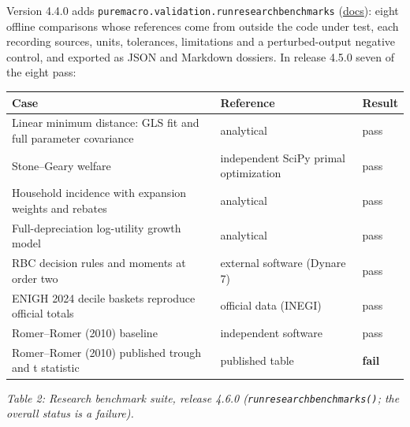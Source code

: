 \documentclass[11pt,letterpaper]{article}
\newcounter{none} %
\renewcommand{\_}{\pmunderscore\allowbreak}
\begin{document}
Version 4.4.0 adds \texttt{puremacro.validation.run\_research\_benchmarks} (\href{https://github.com/jalonso1979/puremacro/blob/v4.6.0/docs/research_benchmarks.md}{docs}): eight offline comparisons whose references come from outside the code under test, each recording sources, units, tolerances, limitations and a perturbed-output negative control, and exported as JSON and Markdown dossiers. In release 4.5.0 seven of the eight pass:

{\def\LTcaptype{none} %
\begin{longtable}[]{@{}
  >{\raggedright\arraybackslash}p{}
  >{\raggedright\arraybackslash}p{}
  >{\centering\arraybackslash}p{}@{}}
\toprule\noalign{}
\begin{minipage}[b]{\linewidth}\raggedright
Case
\end{minipage} & \begin{minipage}[b]{\linewidth}\raggedright
Reference
\end{minipage} & \begin{minipage}[b]{\linewidth}\centering
Result
\end{minipage} \\
\midrule\noalign{}
\endhead
\bottomrule\noalign{}
\endlastfoot
Linear minimum distance: GLS fit and full parameter covariance & analytical & pass \\
Stone--Geary welfare & independent SciPy primal optimization & pass \\
Household incidence with expansion weights and rebates & analytical & pass \\
Full-depreciation log-utility growth model & analytical & pass \\
RBC decision rules and moments at order two & external software (Dynare 7) & pass \\
ENIGH 2024 decile baskets reproduce official totals & official data (INEGI) & pass \\
Romer--Romer (2010) baseline & independent software & pass \\
Romer--Romer (2010) published trough and t statistic & published table & \textbf{fail} \\
\end{longtable}
}

\emph{Table 2: Research benchmark suite, release 4.6.0 (\texttt{run\_research\_benchmarks()}; the overall status is a failure).}
\end{document}
